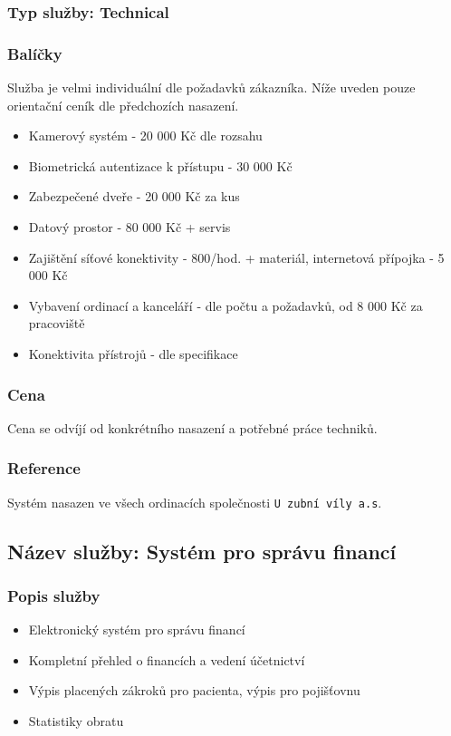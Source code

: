 \documentclass[11pt, a4paper, titlepage]{article}
\begin{document}
	\subsubsection*{Typ služby: Technical}

	\subsubsection*{Balíčky}
	Služba je velmi individuální dle požadavků zákazníka. Níže uveden pouze orientační ceník dle předchozích nasazení. 

	\begin{itemize}
		\item Kamerový systém - 20 000 Kč dle rozsahu
		\item Biometrická autentizace k přístupu - 30 000 Kč
		\item Zabezpečené dveře - 20 000 Kč za kus
		\item Datový prostor - 80 000 Kč + servis
		\item Zajištění síťové konektivity - 800/hod. + materiál, internetová přípojka - 5 000 Kč
		\item Vybavení ordinací a kanceláří - dle počtu a požadavků, od 8 000 Kč za pracoviště
		\item Konektivita přístrojů - dle specifikace
	\end{itemize}

	\subsubsection*{Cena}
	Cena se odvíjí od konkrétního nasazení a potřebné práce techniků.

	\subsubsection*{Reference}
	Systém nasazen ve všech ordinacích společnosti \texttt{U zubní víly a.s}.

	\subsection*{Název služby: Systém pro správu financí}

	\subsubsection*{Popis služby}
	\begin{itemize}
		\item Elektronický systém pro správu financí
		\item Kompletní přehled o financích a vedení účetnictví
		\item Výpis placených zákroků pro pacienta, výpis pro pojišťovnu
		\item Statistiky obratu
	\end{itemize}
\end{document}

